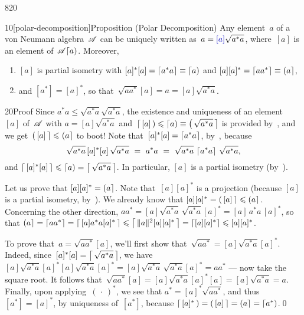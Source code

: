 \begin{parsec}{820}%
\begin{point}{10}[polar-decomposition]{Proposition (Polar Decomposition)}%
%
Any element~$a$ of a von Neumann
algebra~$\mathscr{A}$
can be uniquely written as~$a=\Define{[a]}\sqrt{a^*a}$,%
where~$[a]$
is an element of~$\mathscr{A}\!\left\lceil a\right)$.
Moreover,
\begin{enumerate}
\item
$[a]$ is partial isometry
with $[a]^*[a] = \left\lceil a^*a\right\rceil \equiv \left\lceil a\right)$
and $[a][a]^*=\left\lceil aa^*\right\rceil \equiv \left(a\right\rceil$,
\item
and $[a^*]=[a]^*$, so that~$\sqrt{aa^*}[a]=a=[a]\sqrt{a^*a}$.
\end{enumerate}
\spacingfix%
\begin{point}{20}{Proof}%
Since $a^*a\leq \sqrt{a^*a}\sqrt{a^*a}$,
the existence and uniqueness
of an element~$[a]$ of~$\mathscr{A}$
with $a=[a]\sqrt{a^*a}$
and~$\left\lceil\,[a]\,\right)\leqslant
\left\lceil a\right)\equiv \left(\,\sqrt{a^*a}\,\right\rceil$
is provided by~,
and we get~$\left(\,[a]\,\right\rceil\leqslant \left(a\right\rceil$
to boot!
Note that~$[a]^*[a]=\left\lceil a^*a\right\rceil$,
by~,
because 
\begin{equation*}
	\sqrt{a^*a}\,[a]^*[a]\,\sqrt{a^*a}
\ =\ 
a^*a
\ =\ 
\sqrt{a^*a}\,\ceil{a^*a}\,\sqrt{a^*a},
\end{equation*}
and $\left\lceil\,[a]^*[a]\,\right\rceil\leqslant \left\lceil a\right)=\left\lceil\,\sqrt{a^*a}\,\right\rceil$.
In particular, $[a]$ is a partial isometry
(by~\sref{partial-isometry-equivalents}).

Let us prove that $[a][a]^*=\left(a\right\rceil$.
Note that~$[a][a]^*$
is a projection (because $[a]$ is a partial isometry, 
by~).
We already know that $[a][a]^* = \left(\,[a]\,\right\rceil\leqslant \left(a\right\rceil$.
Concerning the other direction,
$aa^*=[a]\sqrt{a^*a}\,\sqrt{a^*a}[a]^*=[a]\,a^*a\,[a]^*$,
so that
$\left(a\right\rceil=\left\lceil aa^*\right\rceil
= \left\lceil\,[a]a^*a[a]^*\,\right\rceil
\leqslant \left\lceil\,\|a\|^2[a][a]^*\,\right\rceil
	=\left\lceil[a][a]^*\right\rceil
\leqslant [a][a]^*$.

To prove that~$a=\sqrt{aa^*}[a]$,
we'll first show that~$\sqrt{aa^*} = [a] \sqrt{a^*a} [a]^*$.
Indeed, since~$[a]^*[a]=\left\lceil\,\sqrt{a^*a}\,\right\rceil$,
we have
$[a]\sqrt{a^*a}[a]^*[a]\sqrt{a^*a}[a]^*
= [a] \sqrt{a^*a} \,\sqrt{a^*a} [a]^* 
= aa^*$ --- now take the square root.
It follows that~$\sqrt{aa^*}[a]
= [a]\sqrt{a^*a}[a]^*[a]
= [a]\sqrt{a^*a}=a$.
Finally, upon applying~$(\,\cdot\,)^*$,
we see that
$a^*=[a]^*\sqrt{aa^*}$,
and thus~$[a^*]=[a]^*$,
by uniqueness of~$[a^*]$,
because $\left\lceil\,[a]^*\,\right)=\left(\,[a]\,\right\rceil=  \left(a\right\rceil
=\left\lceil a^*\right)$.\qed
\end{point}
\end{point}
\end{parsec}
